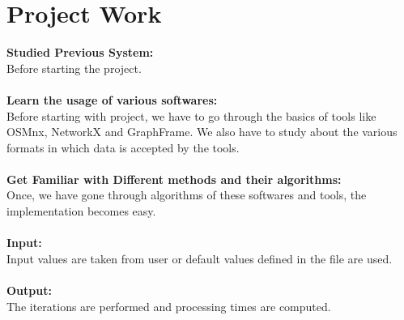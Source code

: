 \section{Project Work} 
\textbf{Studied Previous System:}\\
Before starting the project. \\\\
\textbf{Learn the usage of various softwares:}\\
Before starting with project, we have to go through the basics of tools like OSMnx, NetworkX and GraphFrame. We also have to study about the various formats in which data is accepted by the tools. \\\\
\textbf{Get Familiar with Different methods and their algorithms:}\\
Once, we have gone through algorithms of these softwares and tools, the implementation becomes easy.\\\\
\textbf{Input:}\\
Input values are taken from user or default values defined in the file are used.\\\\
\textbf{Output:}\\
The iterations are performed and processing times are computed.

